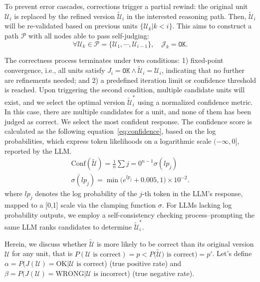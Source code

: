 To prevent error cascades, corrections trigger a partial rewind: the original unit $\mathcal{U}_i$ is replaced by the refined version $\tilde{\mathcal{U}}_i$ in the interested reasoning path. Then, $\tilde{\mathcal{U}}_i$ will be re-validated based on previous units $\{\mathcal{U}_k|k<i\}$.
This aims to construct a path $\mathcal{P}$ with all nodes able to pass self-judging:
\begin{equation}
\forall \mathcal{U}_k \in \mathcal{P}=\{\mathcal{U}_1, \cdots, \mathcal{U}_{i-1}\}, \quad \mathcal{J}_k = \texttt{OK}.
\end{equation}

The correctness process terminates under two conditions: 1) fixed-point convergence, i.e., all units satisfy $J_i = \texttt{OK} \land \tilde{\mathcal{U}}_i = \mathcal{U}_i$, indicating that no further are refinements needed; and 2) a predefined iteration limit or confidence threshold is reached.
Upon triggering the second condition, multiple candidate units will exist, and we select the optimal version $\tilde{\mathcal{U}}_i^*$ using a normalized confidence metric.
In this case, there are multiple candidates for a unit, and none of them has been judged as correct. 
We select the most confident response. 
The confidence score is calculated as the following equation~\ref{eq:confidence}, based on the log probabilities, which express token likelihoods on a logarithmic scale $(-\infty, 0]$, reported by the LLM.
%
\begin{align}\label{eq:confidence}
 \text{Conf}(\tilde{\mathcal{U}}) = \frac{1}{n}\sum{j=0}^{n-1} \sigma(lp_j) \\
 \sigma(lp_j) = \min\big(e^{lp_j} + 0.005, 1\big) \times 10^{-2}.
\end{align}
%
where $lp_j$ denotes the log probability of the $j$-th token in the LLM’s response, mapped to a [0,1] scale via the clamping function $\sigma$. 
For LLMs lacking log probability outputs, we employ a self-consistency checking process--prompting the same LLM ranks candidates to determine $\tilde{\mathcal{U}}_i^*$.

Herein, we discuss whether $\tilde{\mathcal{U}}$ is more likely to be correct than its original version $\mathcal{U}$ for any unit, that is $P(\mathcal{U} \text{ is correct}) = p < P\big(\tilde{\mathcal{U}}) \text{ is correct}\big) = p'$.
Let's define $\alpha = P(J(\mathcal{U})=\text{OK} | \mathcal{U}\text{ is correct}$) (true positive rate) and
$\beta = P(J(\mathcal{U})=\text{WRONG} | \mathcal{U}\text{ is incorrect}$) (true negative rate).

